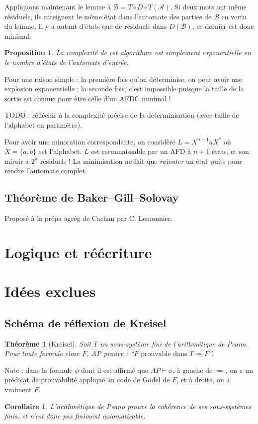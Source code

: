 \documentclass[a4paper, 11pt]{article}
\newtheorem*{proposition}{Proposition}
\newtheorem*{theorem}{Théorème}
\newtheorem*{corollary}{Corollaire}
\begin{document}
Appliquons maintenant le lemme à $\mathcal{B} = T \circ D \circ T(\mathcal{A})$.
Si deux mots ont même résiduels, ils atteignent le même état dans l'automate des
parties de $\mathcal{B}$ en vertu du lemme. Il y a autant d'états que de
résiduels dans $D(\mathcal{B})$, ce dernier est donc minimal.

\begin{proposition}
  La complexité de cet algorithme est simplement exponentielle en le nombre
  d'états de l'automate d'entrée.
\end{proposition}

Pour une raison simple : la première fois qu'on déterminise, on peut avoir une
explosion exponentielle ; la seconde fois, c'est impossible puisque la taille de
la sortie est connue pour être celle d'un AFDC minimal !

TODO : réfléchir à la complexité précise de la déterminisation (avec taille de
l'alphabet en paramètre).

Pour avoir une minoration correspondante, on considère $L = X^{n-1}aX^*$ où $X =
\{a,b\}$ est l'alphabet. $L$ est reconnaissable par un AFD à $n+1$ états, et son
miroir a $2^n$ résiduels ! La minimisation ne fait que \emph{rajouter} un état
puits pour rendre l'automate complet.


\subsection{Théorème de Baker--Gill--Solovay}

Proposé à la prépa agrég de Cachan par C. Lemonnier.

\section{Logique et réécriture}




\section{Idées exclues}

\subsection{Schéma de réflexion de Kreisel}

\begin{theorem}[Kreisel]
  Soit $T$ un sous-système fini de l'arithmétique de Peano. Pour toute formule
  close $F$, AP prouve : \enquote{$F \text{ prouvable dans } T \Rightarrow F$}.
\end{theorem}
Note : dans la formule $\phi$ dont il est affirmé que $AP \vdash \phi$, à gauche
de $\Rightarrow$, on a un prédicat de prouvabilité appliqué au code de Gödel de
$F$, et à droite, on a vraiment $F$.
\begin{corollary}
  L'arithmétique de Peano prouve la cohérence de ses sous-systèmes finis, et
  n'est donc pas finiment axiomatisable.
\end{corollary}
\end{document}
